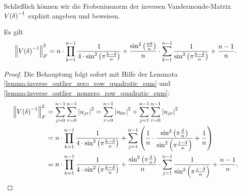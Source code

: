 Schließlich können wir die Frobeniusnorm der inversen Vandermonde-Matrix
$V \! \left( \delta \right)^{-1}$ explizit angeben und beweisen.
\begin{theorem}
    Es gilt
    \begin{equation}
        \left\lVert  V \! \left( \delta \right)^{-1}  \right\rVert_F^2
        = n \cdot \prod_{k=1}^{n-1} \frac{1}{4 \cdot \sin^2 \left( \pi \frac{k-\delta}{n} \right)}
          + \frac{\sin^2 \left( \frac{\pi \delta}{n} \right)}{n} \cdot \sum_{k=1}^{n-1} \frac{1}{\sin^2 \left( \pi \frac{k-\delta}{n} \right)}
          + \frac{n-1}{n}.
    \end{equation}
\end{theorem}
\begin{proof}
    Die Behauptung folgt sofort mit Hilfe der Lemmata
    \ref{lemma:inverse_outlier_zero_row_quadratic_sum} und
    \ref{lemma:inverse_outlier_nonzero_row_quadratic_sum}:
    \[
        \begin{split}
            \left\lVert  V \! \left( \delta \right)^{-1}  \right\rVert_F^2
            &= \sum_{j=0}^{n-1} \sum_{r=0}^{n-1} \left\lvert u_{jr} \right\rvert^2
             = \sum_{r=0}^{n-1} \left\lvert u_{0r} \right\rvert^2
             + \sum_{j=1}^{n-1} \sum_{r=0}^{n-1} \left\lvert u_{jr} \right\rvert^2\\
            &= n \cdot \prod_{k=1}^{n-1} \frac{1}{4 \cdot \sin^2 \left( \pi \frac{k-\delta}{n} \right)}
             + \sum_{j=1}^{n-1} \left( \frac{1}{n} \cdot \frac{\sin^2 \left( \pi \frac{\delta}{n} \right)}{\sin^2 \left( \pi \frac{j - \delta}{n} \right)}
             + \frac{1}{n} \right)\\
            &= n \cdot \prod_{k=1}^{n-1} \frac{1}{4 \cdot \sin^2 \left( \pi \frac{k-\delta}{n} \right)}
             + \frac{\sin^2 \left( \pi \frac{\delta}{n} \right)}{n} \cdot \sum_{j=1}^{n-1} \frac{1}{\sin^2 \left( \pi \frac{j - \delta}{n} \right)}
             + \frac{n-1}{n}.
         \end{split}
     \]
\end{proof}

